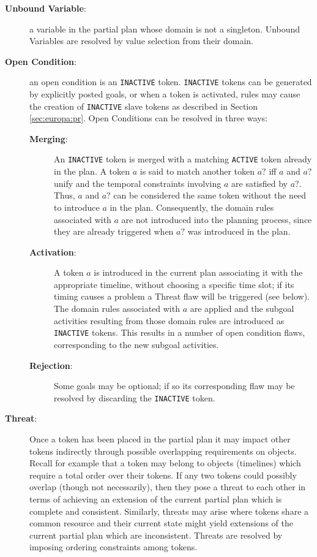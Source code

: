 \begin{description}

\item[\textbf{Unbound Variable}:] a variable in the partial plan whose
  domain is not a singleton. Unbound Variables are resolved by value
  selection from their domain.

\item[\textbf{Open Condition}:] an open condition is an
  \texttt{INACTIVE} token. \texttt{INACTIVE} tokens can be generated
  by explicitly posted goals, or when a token is activated, rules may
  cause the creation of \texttt{INACTIVE} slave tokens as described
  in Section \ref{sec:europa:pr}. Open Conditions can be resolved in
  three ways:

  \begin{description}

  \item[\textbf{Merging}:] An \texttt{INACTIVE} token is merged with a
    matching \texttt{ACTIVE} token already in the plan. A token $a$ is said to
    match another token $a?$ iff $a$ and $a?$ unify \cite{russelnorvig}
    and the temporal constraints involving $a$ are satisfied by
    $a?$. Thus, $a$ and $a?$ can be considered the same token
    without the need to introduce $a$ in the plan. Consequently, the
    domain rules associated with $a$ are not introduced into the
    planning process, since they are already triggered when $a?$ was
    introduced in the plan.

  \item[\textbf{Activation}:] A token $a$ is introduced in the
    current plan associating it with the appropriate timeline, without
    choosing a specific time slot; if its timing causes a problem a
    Threat flaw will be triggered (see below).  The domain rules
    associated with $a$ are applied and the subgoal activities
    resulting from those domain rules are introduced as \texttt{INACTIVE}
    tokens.  This results in a number of open condition flaws,
    corresponding to the new subgoal activities.

  \item[\textbf{Rejection}:] Some goals may be optional; if so its
    corresponding flaw may be resolved by discarding the
    \texttt{INACTIVE} token.

  \end{description}

\item[\textbf{Threat}:] Once a token has been placed in the partial
  plan it may impact other tokens indirectly through possible
  overlapping requirements on objects. Recall for example that a token
  may belong to objects (\eg timelines) which require a total order
  over their tokens. If any two tokens could possibly overlap (though
  not necessarily), then they pose a threat to each other in terms of
  achieving an extension of the current partial plan which is complete
  and consistent. Similarly, threats may arise where tokens share a
  common resource and their current state might yield extensions of
  the current partial plan which are inconsistent. Threats are
  resolved by imposing ordering constraints among tokens.

\end{description}

